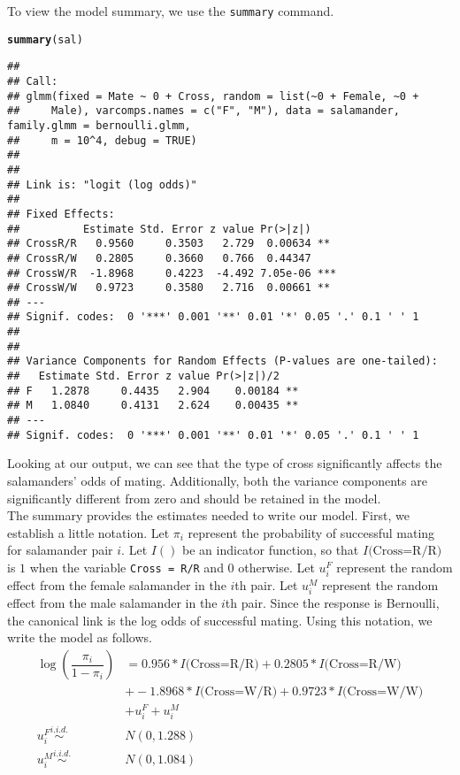 \documentclass[11pt]{article}\usepackage[]{graphicx}\usepackage[]{color}
\makeatletter
\newcommand{\hlstd}[1]{\textcolor[rgb]{0.345,0.345,0.345}{#1}}%
\newcommand{\hlkwd}[1]{\textcolor[rgb]{0.737,0.353,0.396}{\textbf{#1}}}%
\newenvironment{kframe}{%
 \def\at@end@of@kframe{}%
 \ifinner\ifhmode%
  \def\at@end@of@kframe{\end{minipage}}%
  \begin{minipage}{\columnwidth}%
 \fi\fi%
 \def\FrameCommand##1{\hskip\@totalleftmargin \hskip-\fboxsep
 \colorbox{shadecolor}{##1}\hskip-\fboxsep
     \hskip-\linewidth \hskip-\@totalleftmargin \hskip\columnwidth}%
 \MakeFramed {\advance\hsize-\width
   \@totalleftmargin\z@ \linewidth\hsize
   \@setminipage}}%
 {\par\unskip\endMakeFramed%
 \at@end@of@kframe}
\newenvironment{knitrout}{}{} %
\makeatother
\begin{document}
To view the model summary, we use the \texttt{summary} command.
\begin{knitrout}
\color{fgcolor}\begin{kframe}
\begin{alltt}
\hlkwd{summary}\hlstd{(sal)}
\end{alltt}
\begin{verbatim}
## 
## Call:
## glmm(fixed = Mate ~ 0 + Cross, random = list(~0 + Female, ~0 + 
##     Male), varcomps.names = c("F", "M"), data = salamander, family.glmm = bernoulli.glmm, 
##     m = 10^4, debug = TRUE)
## 
## 
## Link is: "logit (log odds)"
## 
## Fixed Effects:
##          Estimate Std. Error z value Pr(>|z|)    
## CrossR/R   0.9560     0.3503   2.729  0.00634 ** 
## CrossR/W   0.2805     0.3660   0.766  0.44347    
## CrossW/R  -1.8968     0.4223  -4.492 7.05e-06 ***
## CrossW/W   0.9723     0.3580   2.716  0.00661 ** 
## ---
## Signif. codes:  0 '***' 0.001 '**' 0.01 '*' 0.05 '.' 0.1 ' ' 1
## 
## 
## Variance Components for Random Effects (P-values are one-tailed):
##   Estimate Std. Error z value Pr(>|z|)/2   
## F   1.2878     0.4435   2.904    0.00184 **
## M   1.0840     0.4131   2.624    0.00435 **
## ---
## Signif. codes:  0 '***' 0.001 '**' 0.01 '*' 0.05 '.' 0.1 ' ' 1
\end{verbatim}
\end{kframe}
\end{knitrout}

Looking at our output, we can see that the type of cross significantly affects the salamanders' odds of mating. Additionally, both the variance components are significantly different from zero and should be retained in the model.\\

The summary provides the estimates needed to write our model. First, we establish a little notation. Let $\pi_i$ represent the probability of successful mating for salamander pair $i$. Let $I()$ be an indicator function, so that $I\text{(Cross=R/R)}$ is $1$ when the variable \texttt{Cross = R/R} and 0 otherwise. Let $u_i^F$ represent the random effect from the female salamander in the $i$th pair. Let $u_i^M$ represent the random effect from the male salamander in the $i$th pair. Since the response is Bernoulli, the canonical link is the log odds of successful mating. Using this notation, we write the model as follows.\\
\begin{align*}
\log \left( \dfrac{\pi_i}{1-\pi_i} \right) &= 0.956 * I\text{(Cross=R/R)} + 0.2805 * I\text{(Cross=R/W)}\\
 &+ -1.8968 * I\text{(Cross=W/R)}
+ 0.9723 * I\text{(Cross=W/W)}\\
 &+ u_i^F+u_i^M\\
u_i^F \overset{i.i.d.}{\sim} &N(0,1.288)\\
u_i^M \overset{i.i.d.}{\sim} &N(0,1.084)\\
\end{align*}
\end{document}
